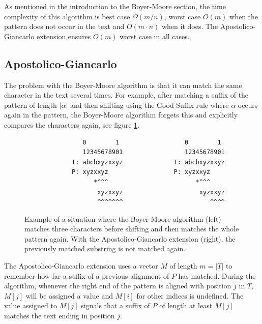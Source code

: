 As mentioned in the introduction to the Boyer-Moore section, the time complexity of this algorithm is best case $\Omega(m/n)$, worst case $O(m)$ when the pattern does not occur in the text and $O(m\cdot n)$ when it does. The Apostolico-Giancarlo extension ensures $O(m)$ worst case in all cases. 

\subsection{Apostolico-Giancarlo}

The problem with the Boyer-Moore algorithm is that it can match the same character in the text several times. For example, after matching a suffix of the pattern of length $|\alpha|$ and then shifting using the Good Suffix rule where $\alpha$ occurs again in the pattern, the Boyer-Moore algorithm forgets this and explicitly compares the characters again, see figure \ref{fig:apostolicoexample}. 

\begin{figure}[ht!]
\begin{verbatim}
                0        1                  0        1 
                12345678901                 12345678901
             T: abcbxyzxxyz              T: abcbxyzxxyz
             P: xyzxxyz                  P: xyzxxyz    
                   *^^^                        *^^^    
                    xyzxxyz                     xyzxxyz
                    ^^^^^^^                        ^^^^
\end{verbatim}
\caption{Example of a situation where the Boyer-Moore algorithm (left) matches three characters before shifting and then matches the whole pattern again. With the Apostolico-Giancarlo extension (right), the previously matched substring is not matched again. }
\label{fig:apostolicoexample}
\end{figure}

The Apostolico-Giancarlo extension uses a vector $M$ of length $m=|T|$ to remember how far a suffix of a previous alignment of $P$ has matched. During the algorithm, whenever the right end of the pattern is aligned with position $j$ in $T$, $M[j]$ will be assigned a value and $M[i]$ for other indices is undefined. The value assigned to $M[j]$ signals that a suffix of $P$ of length at least $M[j]$ matches the text ending in position $j$. 

